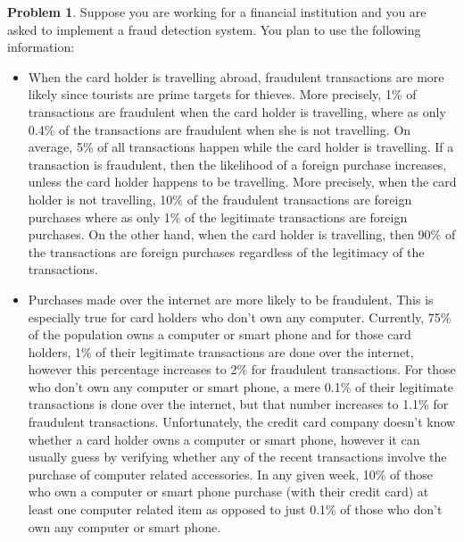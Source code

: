 \documentclass{article}
\theoremstyle{definition}
\newtheorem{problem}{Problem}
\begin{document}
\begin{problem} %
		\item Suppose you are working for a financial institution and you are asked to implement a fraud detection system. You plan to use the following information:
	\begin{itemize} 
	    \item When the card holder is travelling abroad, fraudulent transactions are more likely since tourists are prime targets for thieves. More precisely, 1\% of transactions are fraudulent when the card holder is travelling, where as only 0.4\% of the transactions are fraudulent when she is not travelling. On average, 5\% of all transactions happen while the card holder is travelling. If a transaction is fraudulent, then the likelihood of a foreign purchase increases, unless the card holder happens to be travelling. More precisely, when the card holder is not travelling, 10\% of the fraudulent transactions are foreign purchases where as only 1\% of the legitimate transactions are foreign purchases. On the other hand, when the card holder is travelling, then 90\% of the transactions are foreign purchases regardless of the legitimacy of the transactions.
	    \item Purchases made over the internet are more likely to be fraudulent. This is especially true for card holders who don’t own any computer. Currently, 75\% of the population owns a computer or smart phone and for those card holders, 1\% of their legitimate transactions are done over the internet, however this percentage increases to 2\% for fraudulent transactions. For those who don’t own any computer or smart phone, a mere 0.1\% of their legitimate transactions is done over the internet, but that number increases to 1.1\% for fraudulent transactions. Unfortunately, the credit card company doesn’t know whether a card holder owns a computer or smart phone, however it can usually guess by verifying whether any of the recent transactions involve the purchase of computer related accessories. In any given week, 10\% of those who own a computer or smart phone purchase (with their credit card) at least one computer related item as opposed to just 0.1\% of those who don’t own any computer or smart phone.
\end{itemize} 


\end{problem}
\end{document}
